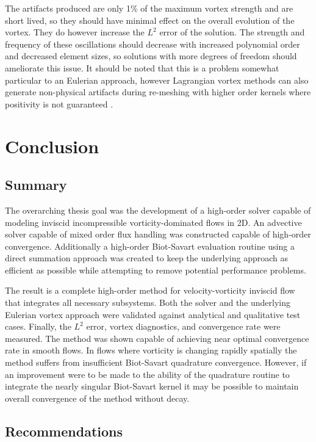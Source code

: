 \documentclass[letterpaper,12pt]{report}
\begin{document}
The artifacts produced are only 1\% of the maximum vortex strength and are short lived, so they should have minimal effect on the overall evolution of the vortex. They do however increase the $L^2$ error of the solution. The strength and frequency of these oscillations should decrease with increased polynomial order and decreased element sizes, so solutions with more degrees of freedom should ameliorate this issue. It should be noted that this is a problem somewhat particular to an Eulerian approach, however Lagrangian vortex methods can also generate non-physical artifacts during re-meshing with higher order kernels where positivity is not guaranteed \cite{Koum1997}.

\chapter{Conclusion}
\section{Summary}
The overarching thesis goal was the development of a high-order solver capable of modeling inviscid incompressible vorticity-dominated flows in 2D. An advective solver capable of mixed order flux handling was constructed capable of high-order convergence. Additionally a high-order Biot-Savart evaluation routine using a direct summation approach was created to keep the underlying approach as efficient as possible while attempting to remove potential performance problems.

The result is a complete high-order method for velocity-vorticity inviscid flow that integrates all necessary subsystems. Both the solver and the underlying Eulerian vortex approach were validated against analytical and qualitative test cases. Finally, the $L^2$ error, vortex diagnostics, and convergence rate were measured. The method was shown capable of achieving near optimal convergence rate in smooth flows. In flows where vorticity is changing rapidly spatially the method suffers from insufficient Biot-Savart quadrature convergence. However, if an improvement were to be made to the ability of the quadrature routine to integrate the nearly singular Biot-Savart kernel it may be possible to maintain overall convergence of the method without decay.

\section{Recommendations}
\end{document}
